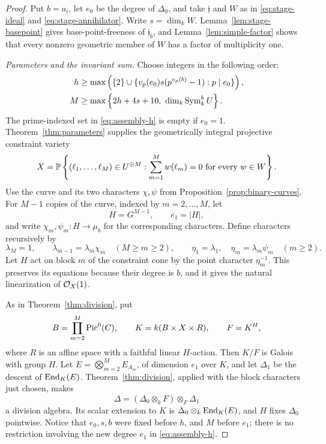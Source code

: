 \begin{proof}
Put \(b=a_i\), let \(e_0\) be the degree of \(\Delta_0\), and take
\(\mathfrak j\) and \(W\) as in
\eqref{eq:stage-ideal} and \eqref{eq:stage-annihilator}.
Write \(s=\dim_k W\).
Lemma~\ref{lem:stage-basepoint} gives base-point-freeness of
\(\mathfrak j_b\), and Lemma~\ref{lem:simple-factor} shows that every
nonzero geometric member of \(W\) has a factor of multiplicity one.

\smallskip\noindent
\emph{Parameters and the invariant sum.}
Choose integers in the following order:
\begin{align}
 h&\ge
 \max\left(\{2\}\cup
   \{v_p(e_0)s(p^{v_p(b)}-1):p\mid e_0\}\right),\label{eq:assembly-h}\\
 M&\ge
 \max\left\{2h+4s+10,\ \dim_k\operatorname{Sym}^b_k U\right\}.
 \label{eq:assembly-M}
\end{align}
The prime-indexed set in \eqref{eq:assembly-h} is empty if \(e_0=1\).
Theorem~\ref{thm:parameters} supplies the geometrically integral
projective constraint variety
\[
 X=\mathbb P\left\{(\ell_1,\ldots,\ell_M)\in U^{\oplus M}:
           \sum_{m=1}^M w(\ell_m)=0\ \text{for every }w\in W\right\}.
\]
Use the curve and its two characters \(\chi,\psi\) from
Proposition~\ref{prop:binary-curves}.  For \(M-1\) copies of the curve,
indexed by \(m=2,\ldots,M\), let
\[
 H=G^{M-1},\qquad e_1=|H|,
\]
and write \(\chi_m,\psi_m:H\to\mu_b\) for the corresponding characters.
Define characters recursively by
\begin{equation}
 \lambda_M=1,\qquad
 \lambda_{m-1}=\lambda_m\chi_m\quad(M\ge m\ge2),\qquad
 \eta_1=\lambda_1,\quad \eta_m=\lambda_m\psi_m\quad(m\ge2).
 \label{eq:assembly-weights}
\end{equation}
Let \(H\) act on block \(m\) of the constraint cone by the point character
\(\eta_m^{-1}\).
This preserves its equations because their degree is \(b\), and it gives
the natural linearization of \(\mathcal O_X(1)\).

As in Theorem~\ref{thm:division}, put
\[
 B=\prod_{m=2}^M\operatorname{Pic}^0(C),\qquad
 K=k(B\times X\times R),\qquad F=K^H,
\]
where \(R\) is an affine space with a faithful linear \(H\)-action.
Then \(K/F\) is Galois with group \(H\).
Let \(E=\bigotimes_{m=2}^M E_{A_m}\), of dimension \(e_1\) over \(K\),
and let \(\Delta_1\) be the descent of \(\operatorname{End}_K(E)\).
Theorem~\ref{thm:division}, applied with the block characters just chosen,
makes
\begin{equation}
 \Delta=(\Delta_0\otimes_k F)\otimes_F\Delta_1
 \label{eq:assembly-division}
\end{equation}
a division algebra.  Its scalar extension to \(K\) is
\(\Delta_0\otimes_k\operatorname{End}_K(E)\), and \(H\) fixes \(\Delta_0\) pointwise.
Notice that \(e_0,s,b\) were fixed before \(h\), and \(M\) before \(e_1\);
there is no restriction involving the new degree \(e_1\) in
\eqref{eq:assembly-h}.


\end{proof}
